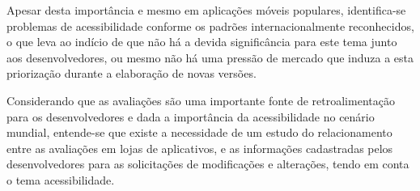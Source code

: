 Apesar desta importância e mesmo em aplicações móveis populares, identifica-se problemas de acessibilidade conforme os padrões internacionalmente reconhecidos, o que leva ao indício de que não há a devida significância para este tema junto aos desenvolvedores, ou mesmo não há uma pressão de mercado que induza a esta priorização durante a elaboração de novas versões.

Considerando que as avaliações são uma importante fonte de retroalimentação para os desenvolvedores e dada a importância da acessibilidade no cenário mundial, entende-se que existe a necessidade de um estudo do relacionamento entre as avaliações em lojas de aplicativos, e as informações cadastradas pelos desenvolvedores para as solicitações de modificações e alterações, tendo em conta o tema acessibilidade.

